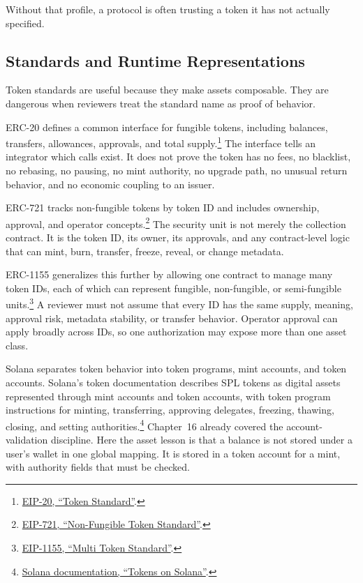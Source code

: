 Without that profile, a protocol is often trusting a token it has not actually specified.

\subsection{Standards and Runtime Representations}

Token standards are useful because they make assets composable. They are dangerous when reviewers treat the standard name as proof of behavior.

ERC-20 defines a common interface for fungible tokens, including balances, transfers, allowances, approvals, and total supply.\footnote{\href{https://eips.ethereum.org/EIPS/eip-20}{EIP-20, ``Token Standard''}.} The interface tells an integrator which calls exist. It does not prove the token has no fees, no blacklist, no rebasing, no pausing, no mint authority, no upgrade path, no unusual return behavior, and no economic coupling to an issuer.

ERC-721 tracks non-fungible tokens by token ID and includes ownership, approval, and operator concepts.\footnote{\href{https://eips.ethereum.org/EIPS/eip-721}{EIP-721, ``Non-Fungible Token Standard''}.} The security unit is not merely the collection contract. It is the token ID, its owner, its approvals, and any contract-level logic that can mint, burn, transfer, freeze, reveal, or change metadata.

ERC-1155 generalizes this further by allowing one contract to manage many token IDs, each of which can represent fungible, non-fungible, or semi-fungible units.\footnote{\href{https://eips.ethereum.org/EIPS/eip-1155}{EIP-1155, ``Multi Token Standard''}.} A reviewer must not assume that every ID has the same supply, meaning, approval risk, metadata stability, or transfer behavior. Operator approval can apply broadly across IDs, so one authorization may expose more than one asset class.

Solana separates token behavior into token programs, mint accounts, and token accounts. Solana's token documentation describes SPL tokens as digital assets represented through mint accounts and token accounts, with token program instructions for minting, transferring, approving delegates, freezing, thawing, closing, and setting authorities.\footnote{\href{https://solana.com/docs/tokens}{Solana documentation, ``Tokens on Solana''}.} Chapter~16 already covered the account-validation discipline. Here the asset lesson is that a balance is not stored under a user's wallet in one global mapping. It is stored in a token account for a mint, with authority fields that must be checked.

